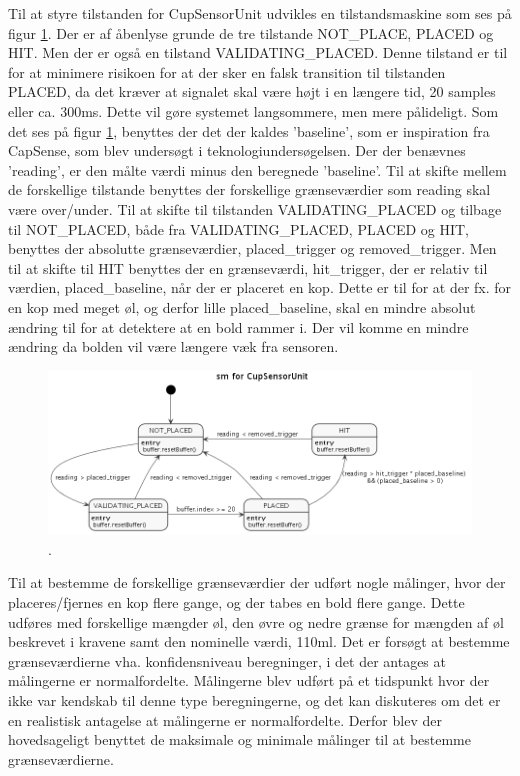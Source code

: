 \documentclass[Rapport/Rapport_main.tex]{subfiles}
\begin{document}
Til at styre tilstanden for CupSensorUnit udvikles en tilstandsmaskine som ses på figur \ref{fig:CupSensor-IF-state}. Der er af åbenlyse grunde de tre tilstande NOT\_PLACE, PLACED og HIT. Men der er også en tilstand VALIDATING\_PLACED. Denne tilstand er til for at minimere risikoen for at der sker en falsk transition til tilstanden PLACED, da det kræver at signalet skal være højt i en længere tid, 20 samples eller ca. 300ms. Dette vil gøre systemet langsommere, men mere pålideligt. Som det ses på figur \ref{fig:CupSensor-IF-state}, benyttes der det der kaldes 'baseline', som er inspiration fra CapSense, som blev undersøgt i teknologiundersøgelsen. Der der benævnes 'reading', er den målte værdi minus den beregnede 'baseline'. Til at skifte mellem de forskellige tilstande benyttes der forskellige grænseværdier som reading skal være over/under. Til at skifte til tilstanden VALIDATING\_PLACED og tilbage til NOT\_PLACED, både fra VALIDATING\_PLACED, PLACED og HIT, benyttes der absolutte grænseværdier, placed\_trigger og removed\_trigger. Men til at skifte til HIT benyttes der en grænseværdi, hit\_trigger, der er relativ til værdien, placed\_baseline, når der er placeret en kop. Dette er til for at der fx. for en kop med meget øl, og derfor lille placed\_baseline, skal en mindre absolut ændring til for at detektere at en bold rammer i. Der vil komme en mindre ændring da bolden vil være længere væk fra sensoren.

\begin{figure}[H]
    \centering
    \includegraphics[width=1\textwidth]{Softwaredesign/CupSensor_IF/graphics/state.png}
    \caption{.}
    \label{fig:CupSensor-IF-state}
\end{figure}

Til at bestemme de forskellige grænseværdier der udført nogle målinger, hvor der placeres/fjernes en kop flere gange, og der tabes en bold flere gange. Dette udføres med forskellige mængder øl, den øvre og nedre grænse for mængden af øl beskrevet i kravene samt den nominelle værdi, 110ml. Det er forsøgt at bestemme grænseværdierne vha. konfidensniveau beregninger, i det der antages at målingerne er normalfordelte. Målingerne blev udført på et tidspunkt hvor der ikke var kendskab til denne type beregningerne, og det kan diskuteres om det er en realistisk antagelse at målingerne er normalfordelte. Derfor blev der hovedsageligt benyttet de maksimale og minimale målinger til at bestemme grænseværdierne.  
\end{document}
